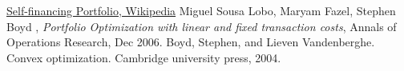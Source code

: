 \documentclass[a4paper]{article}
\begin{document}
\begin{thebibliography}{10}

 \href{http://en.wikipedia.org/wiki/Self-financing\_portfolio}{Self-financing Portfolio, Wikipedia}
 Miguel Sousa Lobo, Maryam Fazel, Stephen Boyd , \textit{Portfolio Optimization with linear and fixed transaction costs}, Annals of Operations Research, Dec 2006.
 Boyd, Stephen, and Lieven Vandenberghe. Convex optimization. Cambridge university press, 2004.
\end{thebibliography}
\end{document}

